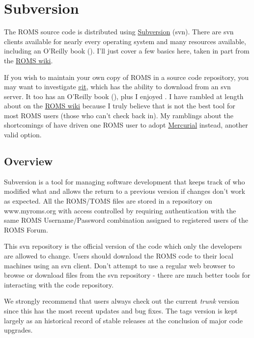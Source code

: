 \section{Subversion}
\label{Svn}

The ROMS source code is distributed using
\href{http://subversion.tigris.org}{Subversion} (svn). There are svn
clients available for nearly every operating system and many
resources available, including an O'Reilly book (\cite{SVN}). I'll
just cover a few basics here, taken in part from the
\href{https://www.myroms.org/wiki/index.php/Subversion}{ROMS wiki}.

If you wish to maintain your own copy of ROMS in a source code
repository, you may want to investigate \href{http://git-scm.com/}{git},
which has the ability to download from an svn server. It too has
an O'Reilly book (\cite{GIT2}), plus I enjoyed
\cite{GIT1}. I have rambled at length about 
on the \href{https://www.myroms.org/wiki/index.php/ROMS_git}{ROMS
wiki} because I truly believe that  is not the best tool
for most ROMS users (those who can't check back in). My ramblings
about the shortcomings of  have driven one ROMS user to adopt
\href{http://mercurial.selenic.com/}{Mercurial} instead, another
valid option.

\subsection{Overview}
Subversion is a tool for managing software development that keeps
track of who modified what and allows the return to a previous
version if changes don't work as expected. All the ROMS/TOMS files
are stored in a  repository on www.myroms.org with access
controlled by requiring authentication with the same ROMS
Username/Password combination assigned to registered users of the
ROMS Forum.

This svn repository is the official version of the code which only
the developers are allowed to change. Users should download the ROMS
code to their local machines using an svn client. Don't attempt to
use a regular web browser to browse or download files from the svn
repository - there are much better tools for interacting with the
code repository.

We strongly recommend that users always check out the current {\em trunk}
version since this has the most recent updates and bug fixes. The
tags version is kept largely as an historical record of stable
releases at the conclusion of major code upgrades.

